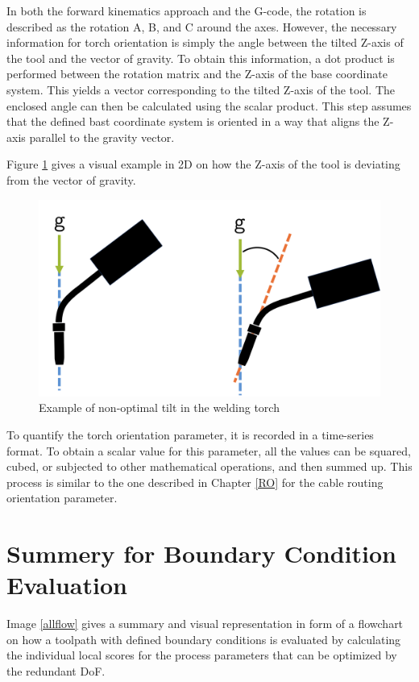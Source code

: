 In both the forward kinematics approach and the G-code, the rotation is described as the rotation A, B, and C around the axes. However, the necessary information for torch orientation is simply the angle between the tilted Z-axis of the tool and the vector of gravity. To obtain this information, a dot product is performed between the rotation matrix and the Z-axis of the base coordinate system. This yields a vector corresponding to the tilted Z-axis of the tool. The enclosed angle can then be calculated using the scalar product. This step assumes that the defined bast coordinate system is oriented in a way that aligns the Z-axis parallel to the gravity vector.

Figure \ref{tilt} gives a visual example in 2D on how the Z-axis of the tool is deviating from the vector of gravity.

\begin{figure}[H]
	\centerline{\includegraphics[width=.45\textwidth]{figures/ttilt.png}}
	\caption{Example of non-optimal tilt in the welding torch}
	\label{tilt}
\end{figure}

To quantify the torch orientation parameter, it is recorded in a time-series format. To obtain a scalar value for this parameter, all the values can be squared, cubed, or subjected to other mathematical operations, and then summed up. This process is similar to the one described in Chapter \ref{RO} for the cable routing orientation parameter.


\newpage
\section{Summery for Boundary Condition Evaluation}



Image \ref{allflow} gives a summary and visual representation in form of a flowchart on how a toolpath with defined boundary conditions is evaluated by calculating the individual local scores for the process parameters that can be optimized by the redundant \acrshort{DoF}.

